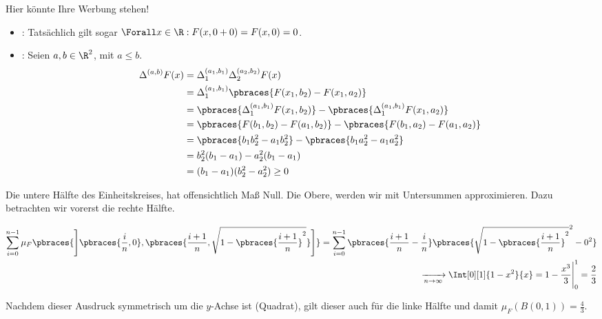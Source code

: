 \begin{solution}

Hier könnte Ihre Werbung stehen!

\begin{itemize}

  \item {}: Tatsächlich gilt sogar $\Forall x \in \R: F(x, 0 + 0) = F(x, 0) = 0$.

  \item {}: Seien $a, b \in \R^2$, mit $a \leq b$.
  \begin{align*}
    \Delta^{(a, b)} F(x)
    & =
    \Delta_1^{(a_1, b_1)}
    \Delta_2^{(a_2, b_2)}
    F(x) \\
    & =
    \Delta_1^{(a_1, b_1)}
    \pbraces{F(x_1, b_2) - F(x_1, a_2)} \\
    & =
    \pbraces{\Delta_1^{(a_1, b_1)} F(x_1, b_2)} -
    \pbraces{\Delta_1^{(a_1, b_1)} F(x_1, a_2)} \\
    & =
    \pbraces{F(b_1, b_2) - F(a_1, b_2)} -
    \pbraces{F(b_1, a_2) - F(a_1, a_2)} \\
    & =
    \pbraces{b_1 b_2^2 - a_1 b_2^2} -
    \pbraces{b_1 a_2^2 - a_1 a_2^2} \\
    & =
    b_2^2 (b_1 - a_1) - a_2^2 (b_1 - a_1) \\
    & =
    (b_1 - a_1) (b_2^2 - a_2^2)
    \geq
    0
  \end{align*}

\end{itemize}

Die untere Hälfte des Einheitskreises, hat offensichtlich Maß Null. Die Obere, werden wir mit Untersummen approximieren. Dazu betrachten wir vorerst die rechte Hälfte.

\begin{align*}
  \sum_{i=0}^{n-1}
  \mu_F
  \pbraces
  {
    \Bigg ]
      \pbraces{\frac{i}{n}, 0},
      \pbraces{\frac{i+1}{n}, \sqrt{1 - \pbraces{\frac{i+1}{n}}^2}}
    \Bigg ]
  }
  =
  \sum_{i=0}^{n-1}
  \pbraces{\frac{i+1}{n} - \frac{i}{n}}
  \pbraces{\sqrt{1 - \pbraces{\frac{i+1}{n}}^2}^2 - 0^2} \\
  \xrightarrow[n \to \infty]{}
  \Int[0][1]{1 - x^2}{x}
  =
  1 - \frac{x^3}{3} \Bigg |_0^1
  =
  \frac{2}{3}
\end{align*}

Nachdem dieser Ausdruck symmetrisch um die $y$-Achse ist (Quadrat), gilt dieser auch für die linke Hälfte und damit $\mu_F(B(0, 1)) = \frac{4}{3}$.

\end{solution}
